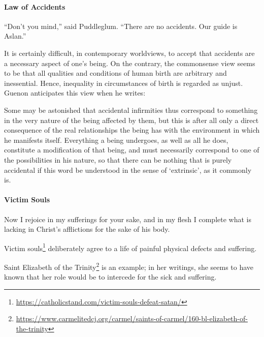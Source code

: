 \paragraph{Law of Accidents}


\begin{quotex}
``Don't you mind,'' said Puddleglum. ``There are no accidents. Our guide is Aslan.''
\end{quotex}


It is certainly difficult, in contemporary worldviews, to accept that accidents are a necessary aspect of one's being. On the contrary, the commonsense view seems to be that all qualities and conditions of human birth are arbitrary and inessential. Hence, inequality in circumstances of birth is regarded as unjust. Guenon anticipates this view when he writes:

\begin{quotex}
Some may be astonished that accidental infirmities thus correspond to something in the very nature of the being affected by them, but this is after all only a direct consequence of the real relationships the being has with the environment in which he manifests itself. Everything a being undergoes, as well as all he does, constitute a modification of that being, and must necessarily correspond to one of the possibilities in his nature, so that there can be nothing that is purely accidental if this word be understood in the sense of `extrinsic', as it commonly is.
\end{quotex}


\paragraph{Victim Souls}


\begin{quotex}
Now I rejoice in my sufferings for your sake, and in my flesh I complete what is lacking in Christ's afflictions for the sake of his body.
\end{quotex}


Victim souls\footnote{\url{https://catholicstand.com/victim-souls-defeat-satan/}} deliberately agree to a life of painful physical defects and suffering.

Saint Elizabeth of the Trinity\footnote{\url{https://www.carmelitedcj.org/carmel/saints-of-carmel/160-bl-elizabeth-of-the-trinity}} is an example; in her writings, she seems to have known that her role would be to intercede for the sick and suffering.


